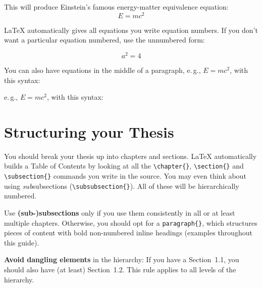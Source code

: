 This will produce Einstein's famous energy-matter equivalence equation:
\begin{equation}
E = mc^{2}
\label{eqn:Einstein}
\end{equation}

LaTeX automatically gives all equations you write equation numbers. If you don't want a particular equation numbered, use the unnumbered form:
\begin{latex}
\[ a^{2}=4 \]
\end{latex}

You can also have equations in the middle of a paragraph, e.\,g., \( E = mc^{2} \), with this syntax: 

\begin{latex}
e.\,g., \( E = mc^{2} \), with this syntax:
\end{latex}


\section{Structuring your Thesis}

You should break your thesis up into chapters and sections. LaTeX automatically builds a Table of Contents by looking at all the \verb|\chapter{}|, \verb|\section{}|  and \verb|\subsection{}| commands you write in the source. You may even think about using \emph{sub}subsections (\verb|\subsubsection{}|). All of these will be hierarchically numbered.

Use \textbf{(sub-)subsections} only if you use them consistently in all or at least multiple chapters. Otherwise, you should opt for a \verb|paragraph{}|, which structures pieces of content with bold non-numbered inline headings (examples throughout this guide).

\textbf{Avoid dangling elements} in the hierarchy: If you have a Section~1.1, you should also have (at least) Section~1.2. This rule applies to all levels of the hierarchy.

